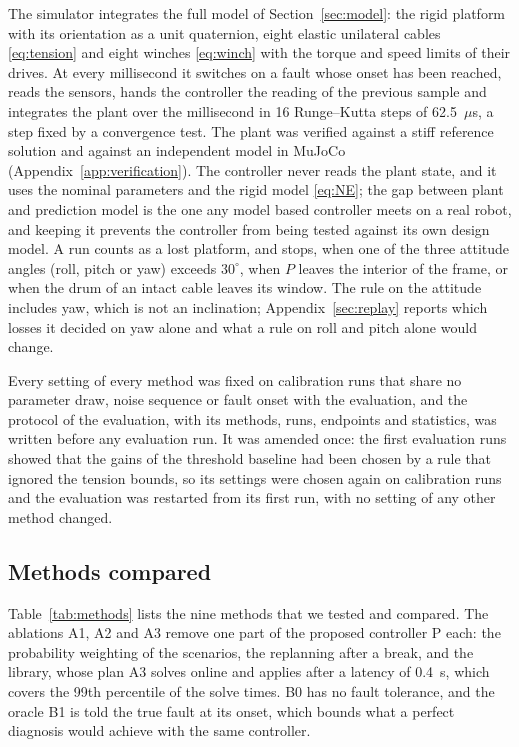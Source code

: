 \documentclass{interact}
\begin{document}
The simulator integrates the full model of Section~\ref{sec:model}: the rigid platform with its orientation as a unit quaternion, eight elastic unilateral cables \eqref{eq:tension} and eight winches \eqref{eq:winch} with the torque and speed limits of their drives. At every millisecond it switches on a fault whose onset has been reached, reads the sensors, hands the controller the reading of the previous sample and integrates the plant over the millisecond in 16 Runge--Kutta steps of 62.5~$\mu$s, a step fixed by a convergence test. The plant was verified against a stiff reference solution and against an independent model in MuJoCo \citep{todorov2012mujoco} (Appendix~\ref{app:verification}). The controller never reads the plant state, and it uses the nominal parameters and the rigid model \eqref{eq:NE}; the gap between plant and prediction model is the one any model based controller meets on a real robot, and keeping it prevents the controller from being tested against its own design model. A run counts as a lost platform, and stops, when one of the three attitude angles (roll, pitch or yaw) exceeds $30^\circ$, when $P$ leaves the interior of the frame, or when the drum of an intact cable leaves its window. The rule on the attitude includes yaw, which is not an inclination; Appendix~\ref{sec:replay} reports which losses it decided on yaw alone and what a rule on roll and pitch alone would change.

Every setting of every method was fixed on calibration runs that share no parameter draw, noise sequence or fault onset with the evaluation, and the protocol of the evaluation, with its methods, runs, endpoints and statistics, was written before any evaluation run. It was amended once: the first evaluation runs showed that the gains of the threshold baseline had been chosen by a rule that ignored the tension bounds, so its settings were chosen again on calibration runs and the evaluation was restarted from its first run, with no setting of any other method changed.

\subsection{Methods compared}\label{sec:methods}

Table~\ref{tab:methods} lists the nine methods that we tested and compared. The ablations A1, A2 and A3 remove one part of the proposed controller P each: the probability weighting of the scenarios, the replanning after a break, and the library, whose plan A3 solves online and applies after a latency of 0.4~s, which covers the 99th percentile of the solve times. B0 has no fault tolerance, and the oracle B1 is told the true fault at its onset, which bounds what a perfect diagnosis would achieve with the same controller.
\end{document}
